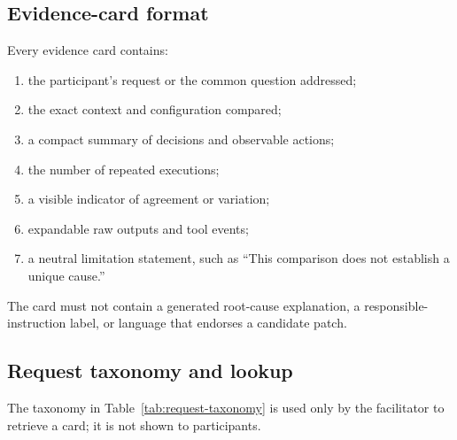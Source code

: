 \subsection{Evidence-card format}

Every evidence card contains:

\begin{enumerate}[leftmargin=*]
    \item the participant's request or the common question addressed;
    \item the exact context and configuration compared;
    \item a compact summary of decisions and observable actions;
    \item the number of repeated executions;
    \item a visible indicator of agreement or variation;
    \item expandable raw outputs and tool events;
    \item a neutral limitation statement, such as ``This comparison does not
    establish a unique cause.''
\end{enumerate}

The card must not contain a generated root-cause explanation, a responsible-
instruction label, or language that endorses a candidate patch.

\subsection{Request taxonomy and lookup}

The taxonomy in Table~\ref{tab:request-taxonomy} is used only by the facilitator
to retrieve a card; it is not shown to participants.

